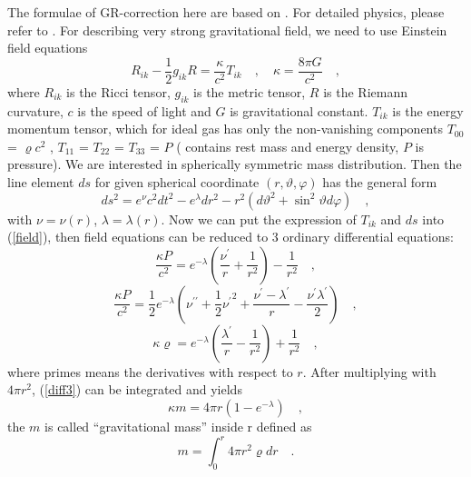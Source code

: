 The formulae of GR-correction here are based on \cite{grbk1}. For
detailed physics, please refer to \cite{grbk2}. For describing very
strong gravitational field, we need to use Einstein field equations
\begin{equation}\label{field}
R_{ik}-\frac{1}{2}g_{ik}R=\frac{\kappa}{c^{2}}T_{ik} \quad , \quad
\kappa=\frac{8\pi G}{c^{2}}\quad ,
\end{equation}
where $R_{ik}$ is the Ricci tensor, $g_{ik}$ is the metric tensor, $R$
is the Riemann curvature, $c$ is the speed of light and $G$ is
gravitational constant. $T_{ik}$ is the energy momentum tensor, which
for ideal gas has only the non-vanishing components $T_{00}$ =
$\varrho c^2$ , $T_{11}$ = $T_{22}$ = $T_{33}$ = $P$ ( contains rest
mass and energy density, $P$ is pressure). We are interested in
spherically symmetric mass distribution. Then the line element $ds$
for given spherical coordinate $(r, \vartheta, \varphi)$ has the
general form
\begin{equation}\label{metric}
  ds^{2} = e^{\nu}c^{2}dt^{2}-e^{\lambda}dr^{2}-r^{2}(d\vartheta^{2}+\sin^{2}
  \vartheta d\varphi) \quad ,
\end{equation}
with $\nu = \nu(r)$, $\lambda = \lambda(r)$. Now we can put the
expression of $T_{ik}$ and $ds$ into (\ref{field}), then field
equations can be reduced to 3 ordinary differential equations:
\begin{equation}\label{diff1}
   \frac{\kappa P}{c^{2}} =
   e^{-\lambda}\left (\frac{\nu^{\prime}}{r}+\frac{1}{r^{2}} \right )-\frac{1}{r^{2}}
   \quad ,
\end{equation}
\begin{equation}\label{diff2}
  \frac{\kappa P}{c^{2}} =
  \frac{1}{2}e^{-\lambda}\left (\nu^{\prime\prime}+\frac{1}{2}{\nu^{\prime}}^{2}+\frac{\nu^
    {\prime}-\lambda^{\prime}}{r}
   -\frac{\nu^{\prime}\lambda^{\prime}}{2} \right ) \quad ,
\end{equation}
\begin{equation}\label{diff3}
  \kappa \varrho =
  e^{-\lambda}\left (\frac{\lambda^{\prime}}{r}-\frac{1}{r^{2}}\right )+\frac{1}{r^{2}} \quad ,
\end{equation}
where primes means the derivatives with respect to $r$. After
multiplying with $4\pi r^2$, (\ref{diff3}) can be integrated and
yields
\begin{equation}\label{gmass1}
  \kappa m = 4\pi r (1-e^{-\lambda}) \quad ,
\end{equation}
the $m$ is called ``gravitational mass'' inside r defined as
\begin{equation}\label{gmass2}
  m = \int_{0}^{r}4\pi r^{2}  \varrho dr\quad .
\end{equation}
